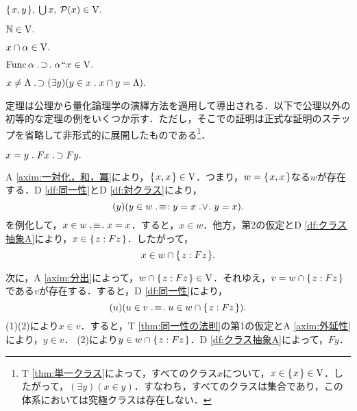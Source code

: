 \begin{axim}[一対化，和，冪]
\label{axim:一対化，和，冪}
$
    \{\mspace{2mu}x,y\mspace{2mu}\},\:{\textstyle\bigcup}\mspace{3mu}x,\:\mathcal{P}(x)\in\mathrm{V}.
$
\end{axim}

\begin{axim}[無限]
\label{axim:無限}
$
    \mathbb{N}\in\mathrm{V}.
$
\end{axim}

\begin{axim}[分出]
\label{axim:分出}
$
    x\cap\alpha\in\mathrm{V}.
$
\end{axim}

\begin{axim}[置換]
\label{axim:置換}
$
    \func\alpha\case{1}{1}{1}\alpha\img x\in\univ.
$
\end{axim}

\begin{axim}[正則性]
\label{axim:正則性}
$
    x\neq \Lambda {\;.\!}\supset (\exists y)(y\in x{\;.\;}x\cap y=\Lambda).
$
\end{axim}

定理は公理から量化論理学の演繹方法を適用して導出される．以下で公理以外の初等的な定理の例をいくつか示す．ただし，そこでの証明は正式な証明のステップを省略して非形式的に展開したものである\footnote{
    T \ref{thm:単一クラス}によって，すべてのクラス$x$について，$x\in\{\mspace{2mu}x\mspace{2mu}\}\in\mathrm{V}$．したがって，$(\exists y)(x\in y)$．すなわち，すべてのクラスは集合であり，この体系においては究極クラスは存在しない．
}．

\begin{thm}[同一性の法則]
\label{thm:同一性の法則}
$
    x=y\con{1}Fx\case{1}{1}{0}Fy.
$
\end{thm}
\setcounter{equation}{0}
\begin{pf}

A \ref{axim:一対化，和，冪}により，$\{\mspace{2mu}x,x\mspace{2mu}\}\in\mathrm{V}$．つまり，$w = \{\mspace{2mu}x,x\mspace{2mu}\}$なる$w$が存在する．D \ref{df:同一性}とD \ref{df:対クラス}により，
\[
    (y)(y\in w\case{3}{1}{2}y=x\case{2}{1}{1}y=x).
\]
を例化して，$x\in w\case{3}{1}{1}x = x$．すると，$x\in w$．他方，第2の仮定とD \ref{df:クラス抽象A}により，$ x\in\{\mspace{2mu}z:Fz\mspace{2mu}\} $．したがって，
\begin{equation}
    x\in w\cap\{\mspace{2mu}z:Fz\mspace{2mu}\}.
\end{equation}

次に，A \ref{axim:分出}によって，$w\cap \{\mspace{2mu}z:Fz\mspace{2mu}\}\in\mathrm{V}$．それゆえ，$v=w\cap \{\mspace{2mu}z:Fz\mspace{2mu}\}$である$v$が存在する．すると，D \ref{df:同一性}により，
\begin{equation}
    (u)(u\in v\case{3}{1}{1}u\in w\cap\classab{z:Fz}).
\end{equation}
(1)(2)により$x\in v$．すると，T \ref{thm:同一性の法則}の第1の仮定とA \ref{axim:外延性}により，$y\in v$．
(2)により$y\in w\cap\{\mspace{2mu}z:Fz\mspace{2mu}\}$．D \ref{df:クラス抽象A}によって，$Fy$．
\end{pf}

